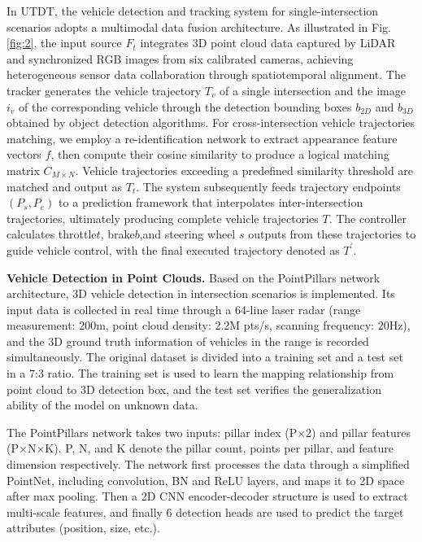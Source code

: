 \documentclass[journal,twoside,web]{ieeecolor}
\begin{document}
In UTDT, the vehicle detection and tracking system for single-intersection scenarios adopts a multimodal data fusion architecture.
As illustrated in Fig. \ref{fig:2}, the input source \(F_{t}\) integrates 3D point cloud data captured by LiDAR and synchronized RGB images from six calibrated cameras, achieving heterogeneous sensor data collaboration through spatiotemporal alignment.
The tracker generates the vehicle trajectory \(T_{v}\) of a single intersection and the image \(i_{v}\) of the corresponding vehicle through the detection bounding boxes \(b_{2D}\) and \(b_{3D}\) obtained by object detection algorithms.
For cross-intersection vehicle trajectories matching, we employ a re-identification network to extract appearance feature vectors \(f\), then compute their cosine similarity to produce a logical matching matrix \(C_{M \times N}\).
Vehicle trajectories exceeding a predefined similarity threshold are matched and output as \(T_{t}\).
The system subsequently feeds trajectory endpoints \((P_{s},P_{e})\) to a prediction framework that interpolates inter-intersection trajectories, ultimately producing complete vehicle trajectories \(T\). 
The controller calculates throttle\(t\), brake\(b\),and steering wheel \(s\) outputs from these trajectories to guide vehicle control, with the final executed trajectory denoted as \(T^\prime\).

\textbf{Vehicle Detection in Point Clouds.}
Based on the PointPillars network architecture, 3D vehicle detection in intersection scenarios is implemented. Its input data is collected in real time through a 64-line laser radar (range measurement: 200m, point cloud density: 2.2M pts/s, scanning frequency: 20Hz), and the 3D ground truth information of vehicles in the range is recorded simultaneously. The original dataset is divided into a training set and a test set in a 7:3 ratio. The training set is used to learn the mapping relationship from point cloud to 3D detection box, and the test set verifies the generalization ability of the model on unknown data.

The PointPillars network takes two inputs: pillar index (P\(\times\)2) and pillar features (P\(\times\)N\(\times\)K).
P, N, and K denote the pillar count, points per pillar, and feature dimension respectively.
The network first processes the data through a simplified PointNet, including convolution, BN and ReLU layers, and maps it to 2D space after max pooling.
Then a 2D CNN encoder-decoder structure is used to extract multi-scale features, and finally 6 detection heads are used to predict the target attributes (position, size, etc.).
\end{document}
